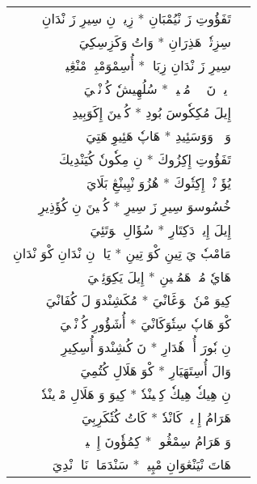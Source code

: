\documentclass[a4paper, 12pt]{report}
\begin{document}
\begin{longtable}{rl}
\textarabic{تَفَؤُوتِ زَ نْيُمْبَانِ  *  زِيوٖ نِ سِيرِ زَ نْدَانِ} & \\ 
\textarabic{سِزِتٗوٖ هَذِرَانِ  *  وَاتُ وَكَزِسِكِيَ} & \\ 
[8mm] 

\textarabic{سِيرِ زَ نْدَانِ زِبَانٖ  *  أُسِمْوَمْبِيٖ مْنْڠِينٖ} & \\ 
\textarabic{وٖيوٖ نَ يٖيٖ مُنٖينٖ  *  سُلُهِيشٗ كُزٖنْڠٖيَ} & \\ 
[8mm] 

\textarabic{إِيلَ مُكِكٗوسَ بُودِ  *  كُنٖينَ إِكَوَبِيدِ} & \\ 
\textarabic{وَزٖئٖ وَوَسَئِيدِ  *  هَاپٗ هَئِيوِ هَتِيَ} & \\ 
[8mm] 

\textarabic{تَفَؤُوتِ إِكِزُوكَ  *  نِ مِكٗونٗ كُيَنْدِيكَ} & \\ 
\textarabic{يُؤَ نْدٖ إِكِتٗوكَ  *  هُزُوَ نْيِينْڠِ بَلَايَ} & \\ 
[8mm] 

\textarabic{خُسُوسوَ سِيرِ زَ سِيرِ  *  كُنٖينَ نِ كُؤَذِيرِ} & \\ 
\textarabic{إِيلَ إِيوٖ دَكِتَارِ  *  سُؤَالِ مٖوَتَئِيَ} & \\ 
[8mm] 

\textarabic{مَامْبٗ يَ تِينِ كْوَ تِينِ  *  يَاوٖ نِ نْدَانِ كْوَ نْدَانِ} & \\ 
\textarabic{هَايٗ مُوٖ هَمُنٖينِ  *  إِيلَ يَكِوَئِمٖيَ} & \\ 
[8mm] 

\textarabic{كِيوَ مْنٗ مٖوَڠَانْيَ  *  مُكَشِنْدوَ لَ كُفَانْيَ} & \\ 
\textarabic{كْوَ هَاپٗ سِتٗوَكَانْيَ  *  أُشَؤُورِ كُزٖنْڠٖيَ} & \\ 
[8mm] 

\textarabic{نِ بٗورَ أُوٖ هٗدَارِ  *  نَ كُشِنْدوَ أُسِكِيرِ} & \\ 
\textarabic{وَالَ أُسِتَهَيَارِ  *  كْوَ هَلَالِ كُتُمِيَ} & \\ 
[8mm] 

\textarabic{نِ هِيكٗ هِيكٗ كِتٖينْدٗ  *  كِيوَ وَ هَلَالِ مْوٖينْدٗ} & \\ 
\textarabic{هَرَامُ إِوٖيكٖ كَانْدٗ  *  كَاتُ كُتٗكَرِبِيَ} & \\ 
[8mm] 

\textarabic{وَ هَرَامُ سِمْڠُوسٖ  *  كِمُؤٗونَ إِڠٖڠٖيسٖ} & \\ 
\textarabic{هَاتَ نْيَنْڠوَانِ مْپِيسٖ  *  سَنْدَمَانٖ نَايٖ نْدِيَ} & \\ 
[8mm] 


\end{longtable}
\end{document}
